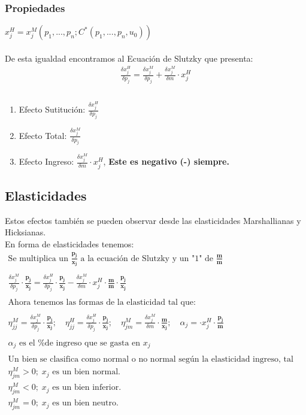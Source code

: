 \documentclass{article}
\begin{document}
\subsubsection{Propiedades}
$x_j^H=x_j^M(p_1,...,p_n;C^*(p_1,...,p_n,u_0))$\\\\
De esta igualdad encontramos al Ecuación de Slutzky que presenta:
\begin{align*}
    \frac{\delta x_j^H}{\delta p_j}=\frac{\delta x_j^M}{\delta p_j} + \frac{\delta x_j^M}{\delta m} \cdot x_j^H\\\\
\end{align*}
\begin{enumerate}
        \item Efecto Sutitución: $\frac{\delta x_j^H}{\delta p_j}$
        \item Efecto Total: $\frac{\delta x_j^M}{\delta p_j}$
        \item Efecto Ingreso: $\frac{\delta x_j^M}{\delta m} \cdot x_j^H$, \textbf{Este es negativo (-) siempre.}
    \end{enumerate}
\newpage
\subsection{Elasticidades}
Estos efectos también se pueden observar desde las elasticidades Marshallianas y Hicksianas. \\
En forma de elasticidades tenemos:
\begin{align*}
    \text{Se multiplica un $\mathbf{\frac{p_j}{x_j}}$ a la ecuación de Slutzky y un "1" de $\mathbf{\frac{m}{m}}$}\\\\
    \frac{\delta x_j^M}{\delta p_j}\cdot \mathbf{\frac{p_j}{x_j}}=\frac{\delta x_j^H}{\delta p_j}\cdot \mathbf{\frac{p_j}{x_j}}-\frac{\delta x_j^M}{\delta m} \cdot x_j^H\cdot \mathbf{\frac{m}{m}\cdot\frac{p_j}{x_j}}\\\\
    \text{Ahora tenemos las formas de la elasticidad tal que:}\\\\
    \eta_{jj}^M=\frac{\delta x_j^M}{\delta p_j}\cdot \mathbf{\frac{p_j}{x_j}};\quad \eta_{jj}^H=\frac{\delta x_j^H}{\delta p_j}\cdot \mathbf{\frac{p_j}{x_j}}; \quad \eta_{jm}^M=\frac{\delta x_j^M}{\delta m} \cdot \mathbf{\frac{m}{x_j}}; \quad \alpha_j=\cdot x_j^H\cdot\mathbf{\frac{p_j}{m}}\\\\
    \text{$\alpha_j$ es el \% de ingreso que se gasta en $x_j$}\\\\
    \text{Un bien se clasifica como normal o no normal según la elasticidad ingreso, tal que:} \\ 
    \eta_{jm}^M>0;\; \text{$x_j$ es un bien normal.}\\
    \eta_{jm}^M<0;\; \text{$x_j$ es un bien inferior.}\\
    \eta_{jm}^M=0;\; \text{$x_j$ es un bien neutro.}\\\\ 
\end{align*}
\newpage
\end{document}
